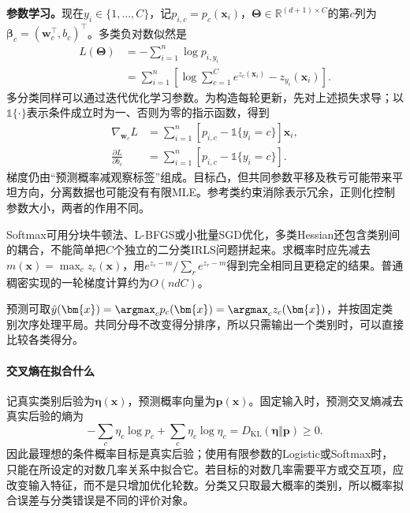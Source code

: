 \textbf{参数学习。}现在$y_i\in\{1,\ldots,C\}$，记$p_{i,c}=p_c(\bm{x}_i)$，$\bm{\Theta}\in\mathbb{R}^{(d+1)\times C}$的第$c$列为$\bm{\beta}_c=(\bm{w}_c^{\top},b_c)^{\top}$。多类负对数似然是
\begin{equation}
  \label{eq:classification-softmax-loss}
  \begin{aligned}
    L(\bm{\Theta})
      &=-\sum_{i=1}^{n}\log p_{i,y_i}\\
      &=\sum_{i=1}^{n}\left[
        \log\sum_{c=1}^{C}e^{z_c(\bm{x}_i)}
        -z_{y_i}(\bm{x}_i)\right].
  \end{aligned}
\end{equation}
多分类同样可以通过迭代优化学习参数。为构造每轮更新，先对上述损失求导；以$\mathbb{1}\{\cdot\}$表示条件成立时为一、否则为零的指示函数，得到
\begin{equation}
  \label{eq:classification-softmax-gradient}
  \begin{aligned}
    \nabla_{\bm{w}_c}L
      &=\sum_{i=1}^{n}
        [p_{i,c}-\mathbb{1}\{y_i=c\}]\bm{x}_i,\\
    \frac{\partial L}{\partial b_c}
      &=\sum_{i=1}^{n}
        [p_{i,c}-\mathbb{1}\{y_i=c\}].
  \end{aligned}
\end{equation}
梯度仍由“预测概率减观察标签”组成。目标凸，但共同参数平移及秩亏可能带来平坦方向，分离数据也可能没有有限MLE。参考类约束消除表示冗余，正则化控制参数大小，两者的作用不同。

Softmax可用分块牛顿法、L-BFGS或小批量SGD优化，多类Hessian还包含类别间的耦合，不能简单把$C$个独立的二分类IRLS问题拼起来。求概率时应先减去$m(\bm{x})=\max_c z_c(\bm{x})$，用$e^{z_c-m}/\sum_r e^{z_r-m}$得到完全相同且更稳定的结果。普通稠密实现的一轮梯度计算约为$O(ndC)$。

预测可取$\hat y(\bm{x})=\argmax_c p_c(\bm{x})=\argmax_c z_c(\bm{x})$，并按固定类别次序处理平局。共同分母不改变得分排序，所以只需输出一个类别时，可以直接比较各类得分。

\paragraph{交叉熵在拟合什么}
\label{sec:classification-logistic-theory}
记真实类别后验为$\bm\eta(\bm x)$，预测概率向量为$\bm p(\bm x)$。固定输入时，预测交叉熵减去真实后验的熵为
\[
 -\sum_c\eta_c\log p_c+\sum_c\eta_c\log\eta_c
 =D_{\mathrm{KL}}(\bm\eta\Vert\bm p)\geq0.
\]
因此最理想的条件概率目标是真实后验；使用有限参数的Logistic或Softmax时，只能在所设定的对数几率关系中拟合它。若目标的对数几率需要平方或交互项，应改变输入特征，而不是只增加优化轮数。分类又只取最大概率的类别，所以概率拟合误差与分类错误是不同的评价对象。

